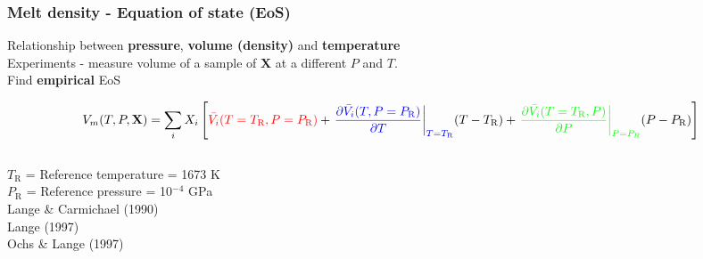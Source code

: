 \documentclass{beamer}
\begin{document}
\begin{frame}
  \frametitle{Melt density - Equation of state (EoS)}

  Relationship between \textbf{pressure}, \textbf{volume (density)} and \textbf{temperature} \\

  Experiments - measure volume of a sample of $\mathbf{X}$ at a different $P$ and $T$. \\

  Find \textbf{empirical} EoS

  \tiny $$ V_{m}(T, P, \mathbf{X}) = \sum_{i} X_{i} \left[ \textcolor{red}{\bar{V_{i}}(T = T_{\text{R}}, P = P_{\text{R}})} + \textcolor{blue}{\left. \frac{\partial \bar{V_{i}}(T, P = P_{\text{R}})}{\partial T}\right|_{T = T_{\text{R}}}} (T - T_{\text{R}}) + \textcolor{green}{\left.\frac{\partial \bar{V_{i}}(T = T_{\text{R}}, P)}{\partial P}\right|_{P = P_{R}}} (P - P_{\text{R}})\right]$$

  \begin{columns}[t]

    \begin{column}{0.3\paperwidth}

      $T_{\text{R}}$ = Reference temperature = 1673 K \\
      $P_{\text{R}}$ = Reference pressure = 10$^{-4}$ GPa \\

      \vspace{1cm}
      Lange \& Carmichael (1990) \\
      Lange (1997) \\
      Ochs \& Lange (1997)

    \end{column}

    \begin{column}{0.7\paperwidth}


\end{column}
\end{columns}
\end{frame}
\end{document}
